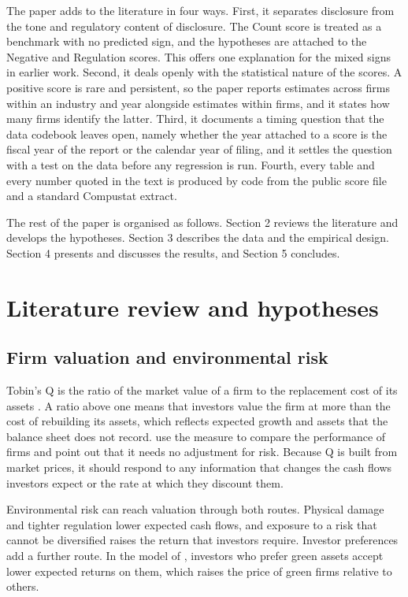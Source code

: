 \documentclass[12pt,a4paper]{article}
\begin{document}
The paper adds to the literature in four ways. First, it separates disclosure from the tone and regulatory content of disclosure. The Count score is treated as a benchmark with no predicted sign, and the hypotheses are attached to the Negative and Regulation scores. This offers one explanation for the mixed signs in earlier work. Second, it deals openly with the statistical nature of the scores. A positive score is rare and persistent, so the paper reports estimates across firms within an industry and year alongside estimates within firms, and it states how many firms identify the latter. Third, it documents a timing question that the data codebook leaves open, namely whether the year attached to a score is the fiscal year of the report or the calendar year of filing, and it settles the question with a test on the data before any regression is run. Fourth, every table and every number quoted in the text is produced by code from the public score file and a standard Compustat extract.

The rest of the paper is organised as follows. Section 2 reviews the literature and develops the hypotheses. Section 3 describes the data and the empirical design. Section 4 presents and discusses the results, and Section 5 concludes.

\section{Literature review and hypotheses}

\subsection{Firm valuation and environmental risk}

Tobin's Q is the ratio of the market value of a firm to the replacement cost of its assets \citep{tobin1969}. A ratio above one means that investors value the firm at more than the cost of rebuilding its assets, which reflects expected growth and assets that the balance sheet does not record. \citet{lang1994} use the measure to compare the performance of firms and point out that it needs no adjustment for risk. Because Q is built from market prices, it should respond to any information that changes the cash flows investors expect or the rate at which they discount them.

Environmental risk can reach valuation through both routes. Physical damage and tighter regulation lower expected cash flows, and exposure to a risk that cannot be diversified raises the return that investors require. Investor preferences add a further route. In the model of \citet{pastor2021}, investors who prefer green assets accept lower expected returns on them, which raises the price of green firms relative to others.
\end{document}
